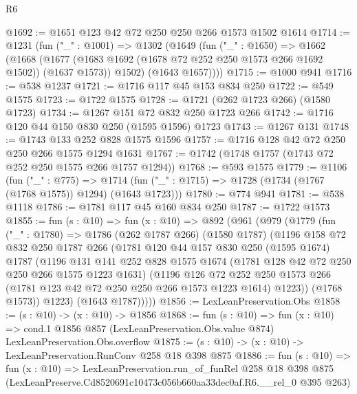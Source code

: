 \begin{lexlean}{R6}
\begin{coremodule}
@1692 := @1651 @123 @42 @72 @250 @250 @266 @1573 @1502 @1614
@1714 := @1231
    (fun ("_" : @1001) =>
    @1302
      (@1649
        (fun ("_" : @1650) =>
        @1662
          (@1668
            (@1677 (@1683 @1692 (@1678 @72 @252 @250 @1573 @266 @1692 @1502)) (@1637 @1573))
            @1502)
          (@1643 @1657))))
@1715 := @1000 @941
@1716 := @538 @1237
@1721 := @1716 @117 @45 @153 @834 @250
@1722 := @549 @1575
@1723 := @1722 @1575
@1728 := @1721 (@262 @1723 @266) (@1580 @1723)
@1734 := @1267 @151 @72 @832 @250 @1723 @266
@1742 := @1716 @120 @44 @150 @830 @250 (@1595 @1596) @1723
@1743 := @1267 @131
@1748 := @1743 @133 @252 @828 @1575 @1596
@1757 := @1716 @128 @42 @72 @250 @250 @266 @1575 @1294 @1631
@1767 := @1742 (@1748 @1757 (@1743 @72 @252 @250 @1575 @266 @1757 @1294))
@1768 := @593 @1575
@1779 := @1106
    (fun ("_" : @775) =>
    @1714 (fun ("_" : @1715) => @1728 (@1734 (@1767 (@1768 @1575)) @1294) (@1643 @1723)))
@1780 := @774 @941
@1781 := @538 @1118
@1786 := @1781 @117 @45 @160 @834 @250
@1787 := @1722 @1573
@1855 := fun (s : @10) =>
  fun (x : @10) =>
  @892
    (@961
      (@979
        (@1779
          (fun ("_" : @1780) =>
          @1786
            (@262 @1787 @266)
            (@1580 @1787)
            (@1196
              @158
              @72
              @832
              @250
              @1787
              @266
              (@1781
                @120
                @44
                @157
                @830
                @250
                (@1595 @1674)
                @1787
                (@1196
                  @131
                  @141
                  @252
                  @828
                  @1575
                  @1674
                  (@1781 @128 @42 @72 @250 @250 @266 @1575 @1223 @1631)
                  (@1196
                    @126
                    @72
                    @252
                    @250
                    @1573
                    @266
                    (@1781 @123 @42 @72 @250 @250 @266 @1573 @1223 @1614)
                    @1223))
                (@1768 @1573))
              @1223)
            (@1643 @1787)))))
@1856 := LexLeanPreservation.Obs
@1858 := (s : @10) -> (x : @10) -> @1856
@1868 := fun (s : @10) =>
  fun (x : @10) =>
  cond.{1} @1856 @857 (LexLeanPreservation.Obs.value @874) LexLeanPreservation.Obs.overflow
@1875 := (s : @10) -> (x : @10) -> LexLeanPreservation.RunConv @258 @18 @398 @875
@1886 := fun (s : @10) =>
  fun (x : @10) =>
  LexLeanPreservation.run_of_funRel
    @258
    @18
    @398
    @875
    (LexLeanPreserve.Cd8520691c10473c056b660aa33dec0af.R6.__rel_0 @395 @263)
\end{coremodule}
\end{lexlean}
